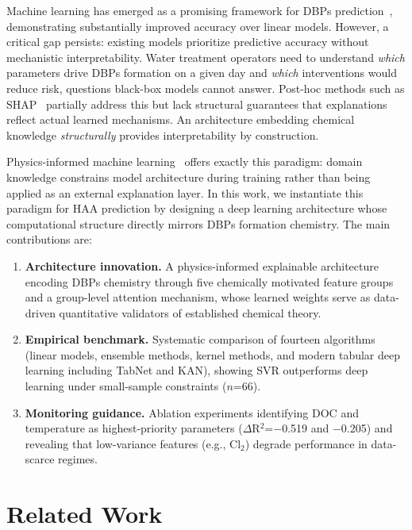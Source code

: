 \documentclass[runningheads]{llncs}
\begin{document}
Machine learning has emerged as a promising framework for DBPs prediction~\cite{kulkarni2010disinfection}, demonstrating substantially improved accuracy over linear models. However, a critical gap persists: existing models prioritize predictive accuracy without mechanistic interpretability. Water treatment operators need to understand \textit{which} parameters drive DBPs formation on a given day and \textit{which} interventions would reduce risk, questions black-box models cannot answer. Post-hoc methods such as SHAP~\cite{lundberg2017unified} partially address this but lack structural guarantees that explanations reflect actual learned mechanisms. An architecture embedding chemical knowledge \textit{structurally} provides interpretability by construction.

Physics-informed machine learning~\cite{raissi2019physics} offers exactly this paradigm: domain knowledge constrains model architecture during training rather than being applied as an external explanation layer. In this work, we instantiate this paradigm for HAA prediction by designing a deep learning architecture whose computational structure directly mirrors DBPs formation chemistry. The main contributions are:
\begin{enumerate}
\item \textbf{Architecture innovation.} A physics-informed explainable architecture encoding DBPs chemistry through five chemically motivated feature groups and a group-level attention mechanism, whose learned weights serve as data-driven quantitative validators of established chemical theory.
\item \textbf{Empirical benchmark.} Systematic comparison of fourteen algorithms (linear models, ensemble methods, kernel methods, and modern tabular deep learning including TabNet and KAN), showing SVR outperforms deep learning under small-sample constraints ($n$=66).
\item \textbf{Monitoring guidance.} Ablation experiments identifying DOC and temperature as highest-priority parameters ($\Delta$R$^2$=$-$0.519 and $-$0.205) and revealing that low-variance features (e.g., Cl$_2$) degrade performance in data-scarce regimes.
\end{enumerate}


\section{Related Work}
\end{document}
